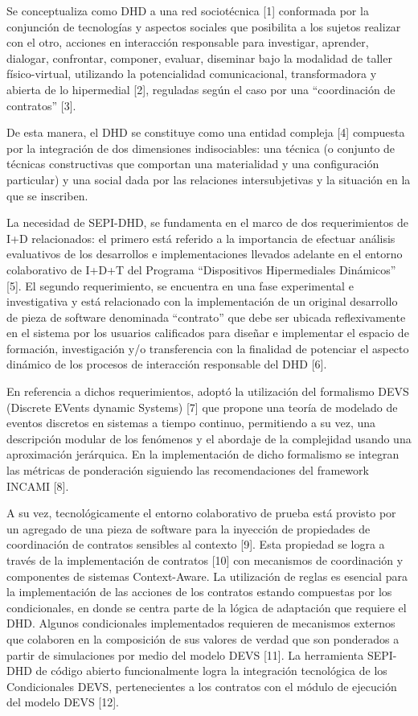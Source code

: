 Se conceptualiza como DHD a una red sociotécnica [1] conformada por la
conjunción de tecnologías y aspectos sociales que posibilita a los sujetos
realizar con el otro, acciones en interacción responsable para investigar,
aprender, dialogar, confrontar, componer, evaluar, diseminar bajo la modalidad
de taller físico-virtual, utilizando la potencialidad comunicacional,
transformadora y abierta de lo hipermedial [2], reguladas según el caso por una
“coordinación de contratos” [3].


De esta manera, el DHD se constituye como una entidad compleja [4] compuesta por
la integración de dos dimensiones indisociables: una técnica (o conjunto de
técnicas constructivas que comportan una materialidad y una configuración
particular) y una social dada por las relaciones intersubjetivas y la situación
en la que se inscriben.


La necesidad de SEPI-DHD, se fundamenta en el marco de dos requerimientos de I+D
relacionados: el primero está referido a la importancia de efectuar análisis
evaluativos de los desarrollos e implementaciones llevados adelante en el
entorno colaborativo de I+D+T del Programa “Dispositivos Hipermediales
Dinámicos” [5]. El segundo requerimiento, se encuentra en una fase experimental
e investigativa y está relacionado con la implementación de un original
desarrollo de pieza de software denominada “contrato” que debe ser ubicada
reflexivamente en el sistema por los usuarios calificados para diseñar e
implementar el espacio de formación, investigación y/o transferencia con la
finalidad de potenciar el aspecto dinámico de los procesos de interacción
responsable del DHD [6].


En referencia a dichos requerimientos, adoptó la utilización del formalismo DEVS
(Discrete EVents dynamic Systems) [7] que propone una teoría de modelado de
eventos discretos en sistemas a tiempo continuo, permitiendo a su vez, una
descripción modular de los fenómenos y el abordaje de la complejidad usando una
aproximación jerárquica. En la implementación de dicho formalismo se integran
las métricas de ponderación siguiendo las recomendaciones del framework INCAMI
[8].

A su vez, tecnológicamente el entorno colaborativo de prueba está provisto por
un agregado de una pieza de software para la inyección de propiedades de
coordinación de contratos sensibles al contexto [9]. Esta propiedad se logra a
través de la implementación de contratos [10] con mecanismos de coordinación y
componentes de sistemas Context-Aware. La utilización de reglas es esencial para
la implementación de las acciones de los contratos estando compuestas por los
condicionales, en donde se centra parte de la lógica de adaptación que requiere
el DHD. Algunos condicionales implementados requieren de mecanismos externos que
colaboren en la composición de sus valores de verdad que son ponderados a partir
de simulaciones por medio del modelo DEVS [11]. La herramienta SEPI-DHD de
código abierto funcionalmente logra la integración tecnológica de los
Condicionales DEVS, pertenecientes a los contratos con el módulo de ejecución
del modelo DEVS [12].

